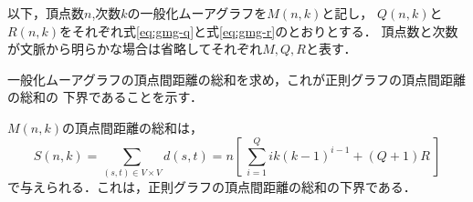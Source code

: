 以下，頂点数$n$,次数$k$の一般化ムーアグラフを$M(n,k)$と記し，
$Q(n,k)$と$R(n,k)$をそれぞれ式\ref{eq:gmg-q}と式\ref{eq:gmg-r}のとおりとする．
頂点数と次数が文脈から明らかな場合は省略してそれぞれ$M,Q,R$と表す．

一般化ムーアグラフの頂点間距離の総和を求め，これが正則グラフの頂点間距離の総和の
下界であることを示す．
\begin{theorem}
  \label{thm:gmg-lower-bound}
  $M(n,k)$の頂点間距離の総和は，
  \begin{equation}
    \label{eq:gmg-lb}
    S(n,k) = \sum_{(s,t)\in V\times V}d(s,t) =
    n \left[\ \sum^{Q}_{i=1}ik(k-1)^{i-1} + (Q+1)R\ \right]
  \end{equation}
  で与えられる．これは，正則グラフの頂点間距離の総和の下界である．
\end{theorem}

